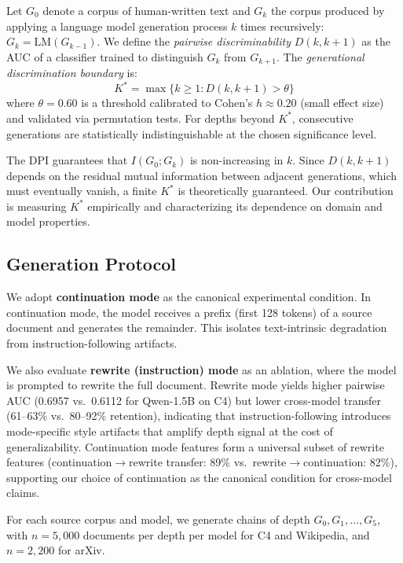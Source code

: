 \documentclass[11pt]{article}
\begin{document}
Let $G_0$ denote a corpus of human-written text and $G_k$ the corpus produced by applying a language model generation process $k$ times recursively: $G_k = \text{LM}(G_{k-1})$. We define the \emph{pairwise discriminability} $D(k, k{+}1)$ as the AUC of a classifier trained to distinguish $G_k$ from $G_{k+1}$. The \emph{generational discrimination boundary} is:
\begin{equation}
    K^* = \max\{k \ge 1 : D(k, k{+}1) > \theta\}
\end{equation}
where $\theta = 0.60$ is a threshold calibrated to Cohen's $h \approx 0.20$ (small effect size) and validated via permutation tests. For depths beyond $K^*$, consecutive generations are statistically indistinguishable at the chosen significance level.

The DPI guarantees that $I(G_0; G_k)$ is non-increasing in $k$. Since $D(k, k{+}1)$ depends on the residual mutual information between adjacent generations, which must eventually vanish, a finite $K^*$ is theoretically guaranteed. Our contribution is measuring $K^*$ empirically and characterizing its dependence on domain and model properties.

\subsection{Generation Protocol}

We adopt \textbf{continuation mode} as the canonical experimental condition. In continuation mode, the model receives a prefix (first 128 tokens) of a source document and generates the remainder. This isolates text-intrinsic degradation from instruction-following artifacts.

We also evaluate \textbf{rewrite (instruction) mode} as an ablation, where the model is prompted to rewrite the full document. Rewrite mode yields higher pairwise AUC (0.6957 vs.\ 0.6112 for Qwen-1.5B on C4) but lower cross-model transfer (61--63\% vs.\ 80--92\% retention), indicating that instruction-following introduces mode-specific style artifacts that amplify depth signal at the cost of generalizability. Continuation mode features form a universal subset of rewrite features (continuation$\to$rewrite transfer: 89\% vs.\ rewrite$\to$continuation: 82\%), supporting our choice of continuation as the canonical condition for cross-model claims.

For each source corpus and model, we generate chains of depth $G_0, G_1, \ldots, G_5$, with $n = 5{,}000$ documents per depth per model for C4 and Wikipedia, and $n = 2{,}200$ for arXiv.
\end{document}
